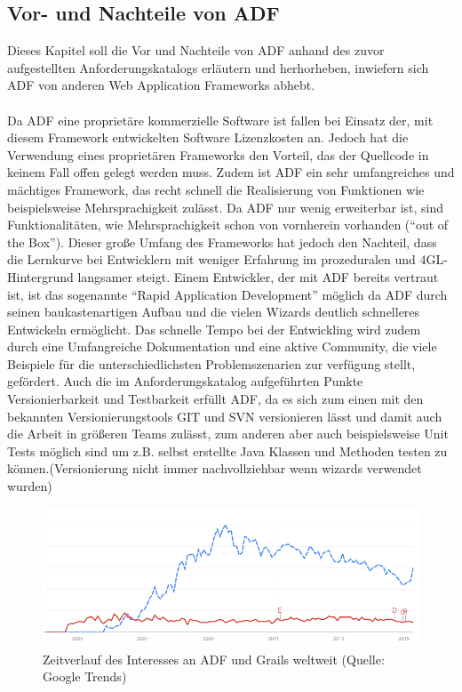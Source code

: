 \subsection{Vor- und Nachteile von ADF}
Dieses Kapitel soll die Vor und Nachteile von ADF anhand des zuvor aufgestellten Anforderungskatalogs erläutern und herhorheben, inwiefern sich ADF von anderen Web Application Frameworks abhebt.\\\\
Da ADF eine proprietäre kommerzielle Software ist fallen bei Einsatz der, mit diesem Framework entwickelten Software Lizenzkosten an. Jedoch hat die Verwendung eines proprietären Frameworks den Vorteil, das der Quellcode in keinem Fall offen gelegt werden muss. Zudem ist ADF ein sehr umfangreiches und mächtiges Framework, das recht schnell die Realisierung von Funktionen wie beispielsweise Mehrsprachigkeit zulässt. Da ADF nur wenig erweiterbar ist, sind Funktionalitäten, wie Mehrsprachigkeit schon von vornherein vorhanden ("`out of the Box"'). Dieser große Umfang des Frameworks hat jedoch den Nachteil, dass die Lernkurve bei Entwicklern mit weniger Erfahrung im prozeduralen und 4GL-Hintergrund langsamer steigt. Einem Entwickler, der mit ADF bereits vertraut ist, ist das sogenannte "`Rapid Application Development"' möglich da ADF durch seinen baukastenartigen Aufbau und die vielen Wizards deutlich schnelleres Entwickeln ermöglicht. Das schnelle Tempo bei der Entwickling wird zudem durch eine Umfangreiche Dokumentation und eine aktive Community, die viele Beispiele für die unterschiedlichsten Problemszenarien zur verfügung stellt, gefördert.
Auch die im Anforderungskatalog aufgeführten Punkte Versionierbarkeit und Testbarkeit erfüllt ADF, da es sich zum einen mit den bekannten Versionierungstools GIT und SVN versionieren lässt und damit auch die Arbeit in größeren Teams zulässt, zum anderen aber auch beispielsweise Unit Tests möglich sind um z.B. selbst erstellte Java Klassen und Methoden testen zu können.(Versionierung nicht immer nachvollziehbar wenn wizards verwendet wurden)
\begin{figure}[H]
\centering
\includegraphics[width=\textwidth]{img/interesse_zeitl.png}
\caption {Zeitverlauf des Interesses an ADF und Grails weltweit (Quelle: Google Trends)}
\end{figure}
